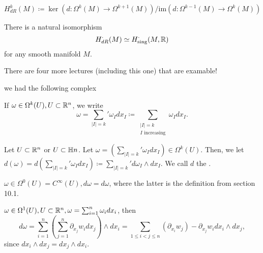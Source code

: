 \begin{definition*}
    \(H_{dR}^k(M)\coloneqq \ker(d:\Omega^k(M)\to\Omega^{k+1}(M))/\text{im}(d:\Omega^{k-1}(M)\to\Omega^k(M))\)
\end{definition*}

\begin{theorem}[deRham]\label{thm:10.11}
    There is a natural isomorphism 
    \[H_{dR}^\cdot(M)\simeq H_{\text{sing}}^\cdot(M,\mathbb{R})\]
    for any smooth manifold \(M\).
\end{theorem}

There are four more lectures (including this one) that are examable!

 we had the following complex 

 If \(\omega\in \Omega^k(U), U\subset \mathbb{R}^n\), we write 
\[\omega=\sum_{|I|=k}'\omega_I dx_I\coloneqq \sum_{\substack{|I|=k\\I\text{ increasing}}}\omega_I dx_I.\]
\begin{definition*}
    Let \(U\subset\mathbb{R}^n\) or \(U\subset \mathbb{H} n\). Let \(\omega=\left(\sum_{|I|=k}'\omega_I dx_I\right)\in\Omega^k(U)\). Then, we 
    let \(d(\omega)=d\left(\sum_{|I|=k}'\omega_I dx_I\right)\coloneqq \sum_{|I|=k}'d\omega_I \wedge dx_I\).
    We call \(d\) the .
\end{definition*}

\begin{example}
    \(\omega\in \Omega^0(U)=C^\infty(U),d\omega=d\omega\), where the latter is the definition from section 10.1.%
\end{example}

\begin{example}
    \(\omega\in \Omega^1(U),U\subset\mathbb{R}^n,\omega=\sum_{i=1}^n \omega_i dx_i\), then 
    \[d\omega = \sum_{i=1}^n\left(\sum_{j=1}^n\partial_{x_j}w_i dx_j\right)\wedge dx_i=\sum_{1\leq i<j\leq n}(\partial_{x_i}w_j)-\partial_{x_j}w_i dx_i\wedge dx_j,\]
    since \(dx_i\wedge dx_j=dx_j\wedge dx_i\).
\end{example}

